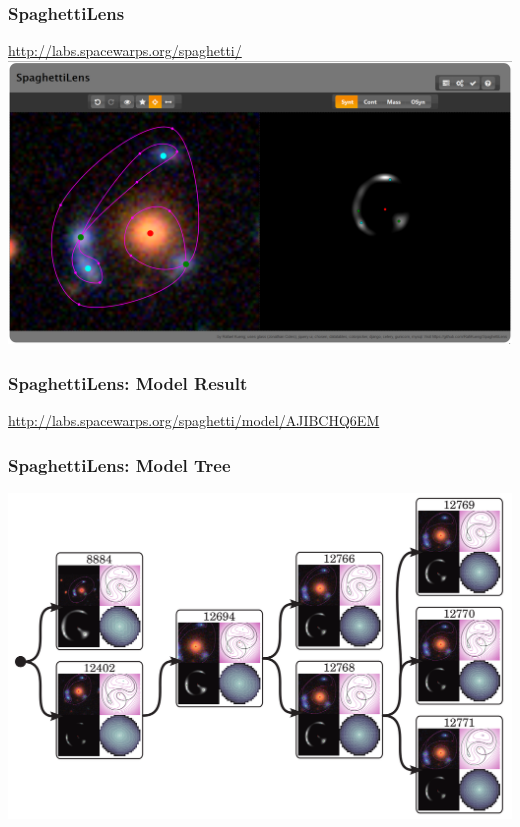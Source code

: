 \documentclass{beamer}
\begin{document}

\begin{frame}
	\frametitle{SpaghettiLens}
	\footnotesize{\url{http://labs.spacewarps.org/spaghetti/}}
  \includegraphics[width=\textwidth]{imgs/screenshot_new}

\end{frame}


\begin{frame}
	\frametitle{SpaghettiLens: Model Result}
  \url{http://labs.spacewarps.org/spaghetti/model/AJIBCHQ6EM}

\end{frame}


\begin{frame}
	\frametitle{SpaghettiLens: Model Tree}
  \includegraphics[width=\textwidth]{imgs/modeltree}

\end{frame}
\end{document}
